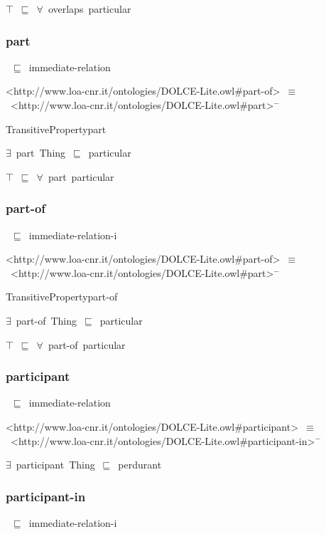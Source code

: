 \documentclass{article}
\begin{document}
\ensuremath{\top}~\ensuremath{\sqsubseteq}~\ensuremath{\forall}~overlaps~particular

\subsubsection*{part}

~\ensuremath{\sqsubseteq}~immediate-relation

<http://www.loa-cnr.it/ontologies/DOLCE-Lite.owl#part-of>~\ensuremath{\equiv}~<http://www.loa-cnr.it/ontologies/DOLCE-Lite.owl#part>\ensuremath{^-}

TransitivePropertypart

\ensuremath{\exists}~part~Thing~\ensuremath{\sqsubseteq}~particular

\ensuremath{\top}~\ensuremath{\sqsubseteq}~\ensuremath{\forall}~part~particular

\subsubsection*{part-of}

~\ensuremath{\sqsubseteq}~immediate-relation-i

<http://www.loa-cnr.it/ontologies/DOLCE-Lite.owl#part-of>~\ensuremath{\equiv}~<http://www.loa-cnr.it/ontologies/DOLCE-Lite.owl#part>\ensuremath{^-}

TransitivePropertypart-of

\ensuremath{\exists}~part-of~Thing~\ensuremath{\sqsubseteq}~particular

\ensuremath{\top}~\ensuremath{\sqsubseteq}~\ensuremath{\forall}~part-of~particular

\subsubsection*{participant}

~\ensuremath{\sqsubseteq}~immediate-relation

<http://www.loa-cnr.it/ontologies/DOLCE-Lite.owl#participant>~\ensuremath{\equiv}~<http://www.loa-cnr.it/ontologies/DOLCE-Lite.owl#participant-in>\ensuremath{^-}

\ensuremath{\exists}~participant~Thing~\ensuremath{\sqsubseteq}~perdurant

\subsubsection*{participant-in}

~\ensuremath{\sqsubseteq}~immediate-relation-i
\end{document}
